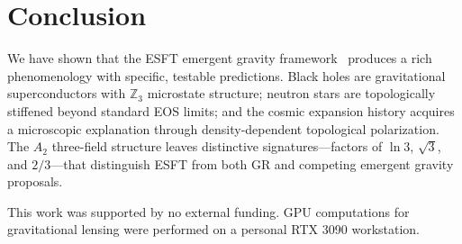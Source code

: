 ﻿\documentclass[twocolumn,preprintnumbers,amsmath,amssymb,prd]{revtex4-2}
\begin{document}
\section{Conclusion}

We have shown that the ESFT emergent gravity framework~\cite{Paper6} produces a rich phenomenology with specific, testable predictions. Black holes are gravitational superconductors with $\mathbb{Z}_3$ microstate structure; neutron stars are topologically stiffened beyond standard EOS limits; and the cosmic expansion history acquires a microscopic explanation through density-dependent topological polarization. The $A_2$ three-field structure leaves distinctive signatures---factors of $\ln 3$, $\sqrt{3}$, and $2/3$---that distinguish ESFT from both GR and competing emergent gravity proposals.

\begin{acknowledgments}
This work was supported by no external funding. GPU computations for gravitational lensing were performed on a personal RTX 3090 workstation. \end{acknowledgments}
\end{document}
